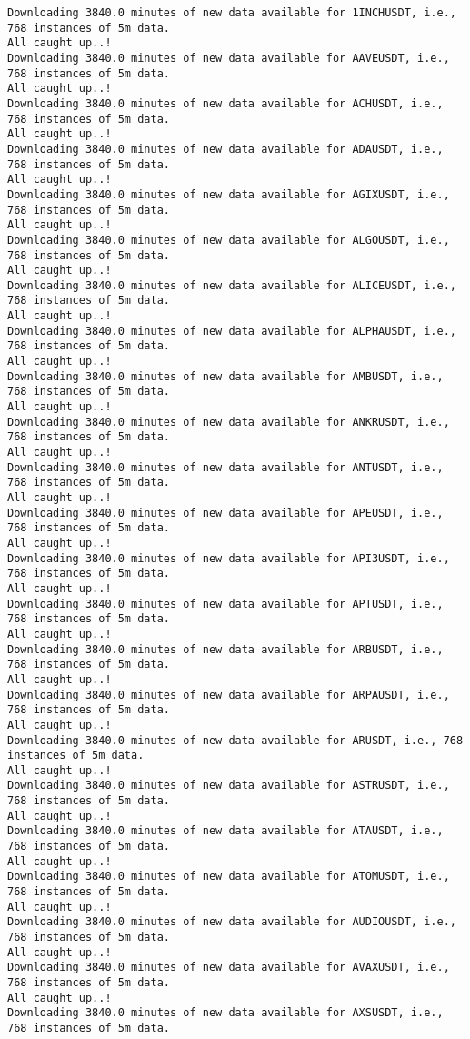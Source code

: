 \documentclass[
  letterpaper,
  DIV=11,
  numbers=noendperiod]{scrartcl}
\begin{document}
\begin{verbatim}
Downloading 3840.0 minutes of new data available for 1INCHUSDT, i.e., 768 instances of 5m data.
All caught up..!
Downloading 3840.0 minutes of new data available for AAVEUSDT, i.e., 768 instances of 5m data.
All caught up..!
Downloading 3840.0 minutes of new data available for ACHUSDT, i.e., 768 instances of 5m data.
All caught up..!
Downloading 3840.0 minutes of new data available for ADAUSDT, i.e., 768 instances of 5m data.
All caught up..!
Downloading 3840.0 minutes of new data available for AGIXUSDT, i.e., 768 instances of 5m data.
All caught up..!
Downloading 3840.0 minutes of new data available for ALGOUSDT, i.e., 768 instances of 5m data.
All caught up..!
Downloading 3840.0 minutes of new data available for ALICEUSDT, i.e., 768 instances of 5m data.
All caught up..!
Downloading 3840.0 minutes of new data available for ALPHAUSDT, i.e., 768 instances of 5m data.
All caught up..!
Downloading 3840.0 minutes of new data available for AMBUSDT, i.e., 768 instances of 5m data.
All caught up..!
Downloading 3840.0 minutes of new data available for ANKRUSDT, i.e., 768 instances of 5m data.
All caught up..!
Downloading 3840.0 minutes of new data available for ANTUSDT, i.e., 768 instances of 5m data.
All caught up..!
Downloading 3840.0 minutes of new data available for APEUSDT, i.e., 768 instances of 5m data.
All caught up..!
Downloading 3840.0 minutes of new data available for API3USDT, i.e., 768 instances of 5m data.
All caught up..!
Downloading 3840.0 minutes of new data available for APTUSDT, i.e., 768 instances of 5m data.
All caught up..!
Downloading 3840.0 minutes of new data available for ARBUSDT, i.e., 768 instances of 5m data.
All caught up..!
Downloading 3840.0 minutes of new data available for ARPAUSDT, i.e., 768 instances of 5m data.
All caught up..!
Downloading 3840.0 minutes of new data available for ARUSDT, i.e., 768 instances of 5m data.
All caught up..!
Downloading 3840.0 minutes of new data available for ASTRUSDT, i.e., 768 instances of 5m data.
All caught up..!
Downloading 3840.0 minutes of new data available for ATAUSDT, i.e., 768 instances of 5m data.
All caught up..!
Downloading 3840.0 minutes of new data available for ATOMUSDT, i.e., 768 instances of 5m data.
All caught up..!
Downloading 3840.0 minutes of new data available for AUDIOUSDT, i.e., 768 instances of 5m data.
All caught up..!
Downloading 3840.0 minutes of new data available for AVAXUSDT, i.e., 768 instances of 5m data.
All caught up..!
Downloading 3840.0 minutes of new data available for AXSUSDT, i.e., 768 instances of 5m data.

\end{verbatim}
\end{document}

